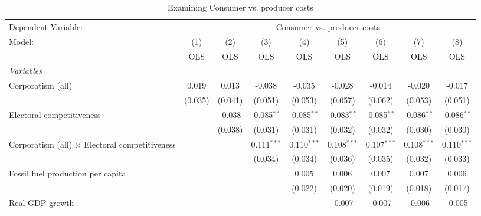 
\begin{table}[htbp]
   \caption{Examining Consumer vs. producer costs}
   \centering
   \begin{tabular}{lcccccccc}
      \toprule
      Dependent Variable: & \multicolumn{8}{c}{Consumer vs. producer costs}\\
      Model:                                                & (1)     & (2)     & (3)           & (4)           & (5)           & (6)           & (7)           & (8)\\  
                                                            &  OLS    & OLS     & OLS           & OLS           & OLS           & OLS           & OLS           & OLS\\  
      \midrule
      \emph{Variables}\\
      Corporatism (all)                                     & 0.019   & 0.013   & -0.038        & -0.035        & -0.028        & -0.014        & -0.020        & -0.017\\   
                                                            & (0.035) & (0.041) & (0.051)       & (0.053)       & (0.057)       & (0.062)       & (0.053)       & (0.051)\\   
      Electoral competitiveness                             &         & -0.038  & -0.085$^{**}$ & -0.085$^{**}$ & -0.083$^{**}$ & -0.085$^{**}$ & -0.086$^{**}$ & -0.086$^{**}$\\   
                                                            &         & (0.038) & (0.031)       & (0.031)       & (0.032)       & (0.032)       & (0.030)       & (0.030)\\   
      Corporatism (all) $\times$ Electoral competitiveness  &         &         & 0.111$^{***}$ & 0.110$^{***}$ & 0.108$^{***}$ & 0.107$^{***}$ & 0.108$^{***}$ & 0.110$^{***}$\\   
                                                            &         &         & (0.034)       & (0.034)       & (0.036)       & (0.035)       & (0.032)       & (0.033)\\   
      Fossil fuel production per capita                     &         &         &               & 0.005         & 0.006         & 0.007         & 0.007         & 0.006\\   
                                                            &         &         &               & (0.022)       & (0.020)       & (0.019)       & (0.018)       & (0.017)\\   
      Real GDP growth                                       &         &         &               &               & -0.007        & -0.007        & -0.006        & -0.005\\   

\end{tabular}
\end{table}
